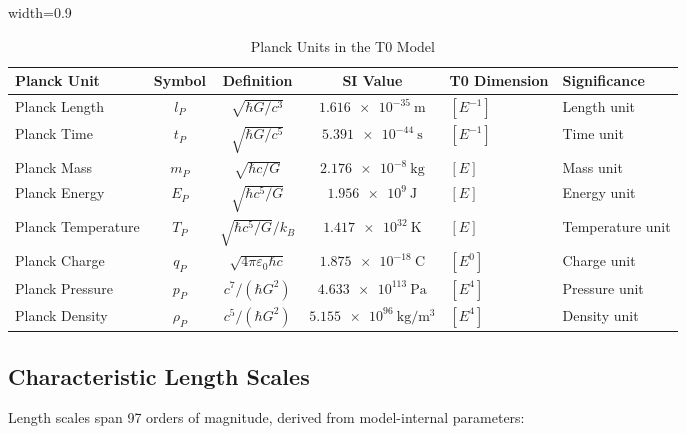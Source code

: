 \documentclass[12pt,a4paper]{article}
\newcommand{\tablescale}{0.9}
\begin{document}
	\begin{table}[htbp]
		\centering
		\begin{adjustbox}{width=\tablescale\textwidth}
			\begin{tabular}{lcccll}
				\toprule
				\textbf{Planck Unit} & \textbf{Symbol} & \textbf{Definition} & \textbf{SI Value} & \textbf{T0 Dimension} & \textbf{Significance} \\
				\midrule
				Planck Length & \(l_P\) & \(\sqrt{\hbar G/c^3}\) & \(\SI{1.616e-35}{\meter}\) & \([E^{-1}]\) & Length unit \\
				Planck Time & \(t_P\) & \(\sqrt{\hbar G/c^5}\) & \(\SI{5.391e-44}{\second}\) & \([E^{-1}]\) & Time unit \\
				Planck Mass & \(m_P\) & \(\sqrt{\hbar c/G}\) & \(\SI{2.176e-8}{\kilogram}\) & \([E]\) & Mass unit \\
				Planck Energy & \(E_P\) & \(\sqrt{\hbar c^5/G}\) & \(\SI{1.956e9}{\joule}\) & \([E]\) & Energy unit \\
				Planck Temperature & \(T_P\) & \(\sqrt{\hbar c^5/G}/k_B\) & \(\SI{1.417e32}{\kelvin}\) & \([E]\) & Temperature unit \\
				Planck Charge & \(q_P\) & \(\sqrt{4\pi \varepsilon_0 \hbar c}\) & \(\SI{1.875e-18}{\coulomb}\) & \([E^0]\) & Charge unit \\
				Planck Pressure & \(p_P\) & \(c^7/(\hbar G^2)\) & \(\SI{4.633e113}{\pascal}\) & \([E^4]\) & Pressure unit \\
				Planck Density & \(\rho_P\) & \(c^5/(\hbar G^2)\) & \(\SI{5.155e96}{\kilogram\per\meter\cubed}\) & \([E^4]\) & Density unit \\
				\bottomrule
			\end{tabular}
		\end{adjustbox}
		\caption{Planck Units in the T0 Model}
		\label{tab:planck_units}
	\end{table}
	
	\subsection{Characteristic Length Scales}
	\label{sec:length_scales}
	
	Length scales span 97 orders of magnitude, derived from model-internal parameters:
	
\end{document}
